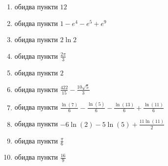\begin{enumerate}
\begin{enumerate}[label*=\arabic*.]
        \item обидва пункти  ${12}$
        \item обидва пункти  ${1 - e^4 - e^5 + e^9}$
        \item обидва пункти  ${2 \ln 2}$
        \item обидва пункти  ${\frac{2\pi}{3}}$
        \item обидва пункти  ${2}$
        \item обидва пункти  ${\frac{422}{15} - \frac{10\sqrt{5}}{3}}$
        \item обидва пункти  ${\frac{\ln\! \left(7\right)}{6}-\frac{\ln\! \left(5\right)}{6}-\frac{\ln\! \left(13\right)}{6}+\frac{\ln\! \left(11\right)}{6}}$
        \item обидва пункти  ${-6 \ln\! \left(2\right)-5 \ln\! \left(5\right)+\frac{11 \ln\! \left(11\right)}{2}}$
        \item обидва пункти  ${\frac{\pi}{6}}$
        \item обидва пункти  ${\frac{16}{9}}$
    \end{enumerate}
\end{enumerate}

